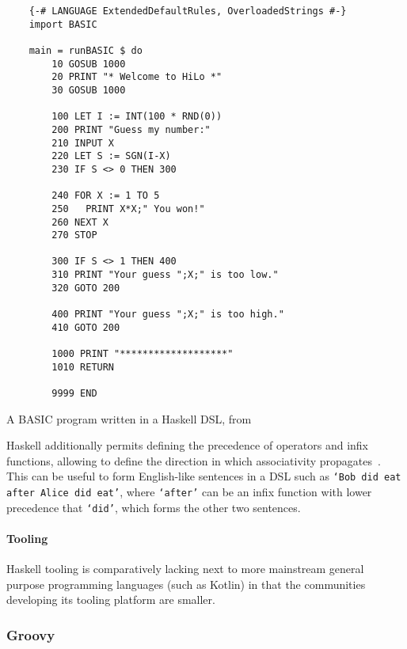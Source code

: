 \begin{listing}[h]
    \centering
    \begin{minipage}{0.8\textwidth}
        \begin{verbatim}
    {-# LANGUAGE ExtendedDefaultRules, OverloadedStrings #-}
    import BASIC

    main = runBASIC $ do
        10 GOSUB 1000
        20 PRINT "* Welcome to HiLo *"
        30 GOSUB 1000

        100 LET I := INT(100 * RND(0))
        200 PRINT "Guess my number:"
        210 INPUT X
        220 LET S := SGN(I-X)
        230 IF S <> 0 THEN 300

        240 FOR X := 1 TO 5
        250   PRINT X*X;" You won!"
        260 NEXT X
        270 STOP

        300 IF S <> 1 THEN 400
        310 PRINT "Your guess ";X;" is too low."
        320 GOTO 200

        400 PRINT "Your guess ";X;" is too high."
        410 GOTO 200

        1000 PRINT "*******************"
        1010 RETURN

        9999 END
        \end{verbatim}
    \end{minipage}
    \caption[BASIC program written in a Haskell DSL]
    {A BASIC program written in a Haskell DSL, from~\cite{haskellBasicDSL}}
    \label{fig:haskellBasicDsl}
\end{listing}

Haskell additionally permits defining the precedence of operators and infix functions, allowing to define the direction in which associativity propagates~\cite{haskellFixity}.
This can be useful to form English-like sentences in a DSL such as \texttt{`Bob did eat after Alice did eat'}, where \texttt{`after'} can be an infix function with lower precedence that \texttt{`did'}, which forms the other two sentences.

\paragraph{Tooling} Haskell tooling is comparatively lacking next to more mainstream general purpose programming languages (such as Kotlin) in that the communities developing its tooling platform are smaller.

\subsubsection{Groovy}

